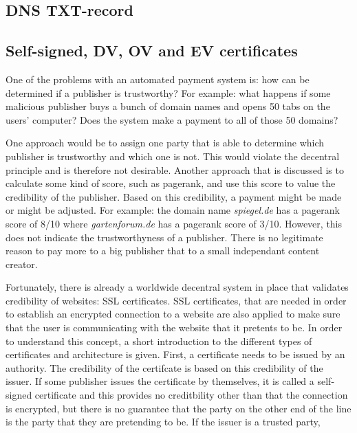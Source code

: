 \subsection{DNS TXT-record}

\subsection{Self-signed, DV, OV and EV certificates}

One of the problems with an automated payment system is: how can be determined if a publisher is trustworthy? For example: what happens if some malicious publisher buys a bunch of domain names and opens 50 tabs on the users' computer? Does the system make a payment to all of those 50 domains? 

One approach would be to assign one party that is able to determine which publisher is trustworthy and which one is not. This would violate the decentral principle and is therefore not desirable. Another approach that is discussed is to calculate some kind of score, such as pagerank, and use this score to value the credibility of the publisher. Based on this credibility, a payment might be made or might be adjusted. For example: the domain name \textit{spiegel.de} has a pagerank score of 8/10 where \textit{gartenforum.de} has a pagerank score of 3/10. However, this does not indicate the trustworthyness of a publisher. There is no legitimate reason to pay more to a big publisher that to a small independant content creator. 

Fortunately, there is already a worldwide decentral system in place that validates credibility of websites: SSL certificates. SSL certificates, that are needed in order to establish an encrypted connection to a website are also applied to make sure that the user is communicating with the website that it pretents to be. In order to understand this concept, a short introduction to the different types of certificates and architecture is given. First, a certificate needs to be issued by an authority. The credibility of the certifcate is based on this credibility of the issuer. If some publisher issues the certificate by themselves, it is called a self-signed certificate and this provides no creditbility other than that the connection is encrypted, but there is no guarantee that the party on the other end of the line is the party that they are pretending to be. If the issuer is a trusted party, 



